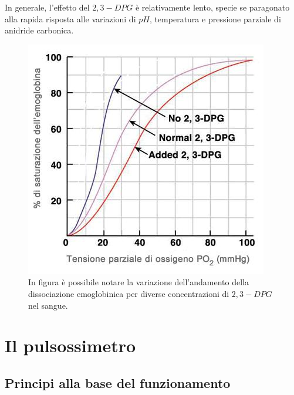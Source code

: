 \documentclass[12pt,a4paper, twoside, openright]{report}
\begin{document}
In generale, l'effetto del $2,3-DPG$ è relativamente lento, specie se paragonato alla rapida risposta alle variazioni di $pH$, temperatura e pressione parziale di anidride carbonica.
\begin{figure}[h!]
    \centering
    \includegraphics[width=\textwidth]{emoglobina-dpg.jpeg}
    \caption{In figura è possibile notare la variazione dell'andamento della 							 dissociazione emoglobinica per diverse concentrazioni di $2,3-DPG$ nel 					 sangue.}
    \label{fig:DPG}
\end{figure}

\newpage
\section{Il pulsossimetro}


\subsection{Principi alla base del funzionamento}
\end{document}

